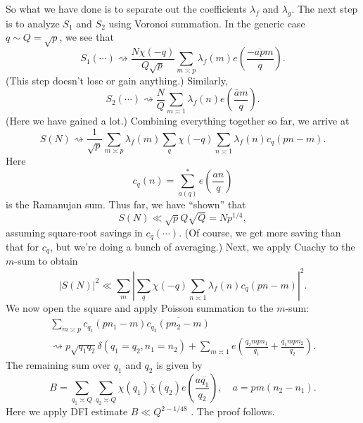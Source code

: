 \documentclass[reqno]{amsart} 
\begin{document}
So what we have done is to separate out the coefficients $\lambda_f$ and $\lambda_g$.  The next step is to analyze $S_1$ and $S_2$ using Voronoi summation.  In the generic case $q \sim Q = \sqrt{p}$, we see that
\begin{equation*}
  S_1(\dotsb) \rightsquigarrow \frac{N \chi(- q)}{Q \sqrt{p}}
  \sum_{m \asymp p}
  \lambda_f(m)
  e \left( \frac{- \overline{a p} m}{q} \right).
\end{equation*}
(This step doesn't lose or gain anything.)  Similarly,
\begin{equation*}
  S_2(\dotsb) \rightsquigarrow \frac{N}{Q} \sum_{m \asymp 1} \lambda_f(n) e \left( \frac{\bar{a} m}{q} \right).
\end{equation*}
(Here we have gained a lot.)  Combining everything together so far, we arrive at
\begin{equation*}
  S(N) \rightsquigarrow \frac{1}{\sqrt{p}}
  \sum_{m \asymp p} \lambda_f(m)
  \sum_q \chi(- q) \sum_{n \asymp 1} \lambda_f(n) c_q(p n - m).
\end{equation*}
Here
\begin{equation*}
  c_q(n) = \sum_{a (q)}^\ast e \left( \frac{a n}{q} \right)
\end{equation*}
is the Ramanujan sum.  Thus far, we have ``shown'' that
\begin{equation*}
  S(N) \ll \sqrt{p} Q \sqrt{Q} = N p^{1/4},
\end{equation*}
assuming square-root savings in $c_q(\dotsb)$.  (Of course, we get more saving than that for $c_q$, but we're doing a bunch of averaging.)  Next, we apply Cuachy to the $m$-sum to obtain
\begin{equation*}
  \lvert S(N) \rvert^2 \ll \sum_m
  \left|
    \sum_q
    \chi(- q)
    \sum_{n \asymp 1}
    \lambda_f(n) c_q(p n - m)\right|^2.
\end{equation*}
We now open the square and apply Poisson summation to the $m$-sum:
\begin{multline*}
  \sum_{m \asymp p} c_{q_1}(p n_1 - m)
  \overline{  c_{q_2}(p n_2 - m)}
  \\
  \rightsquigarrow p
  \sqrt{q_1 q_2} \delta(q_1 = q_2, n_1 = n_2)
  + \sum_{m \asymp 1}
  e \left( \frac{\overline{q_2} m p n_1}{q_1} +
    \frac{\overline{q_1} m p n_2}{ q_2}\right).
\end{multline*}
The remaining sum over $q_1$ and $q_2$ is given by
\begin{equation*}
  B = \sum_{q_1 \asymp Q}
  \sum_{q_2 \asymp Q} \chi(q_1) \overline{\chi}(q_2) e \left( \frac{a \overline{q_1}}{ q_2} \right),
  \quad a = p m(n_2 - n_1).
\end{equation*}
Here we apply DFI estimate $B \ll Q^{2 - 1/48}$ \cite{MR1437494}.  The proof follows.
\end{document}

